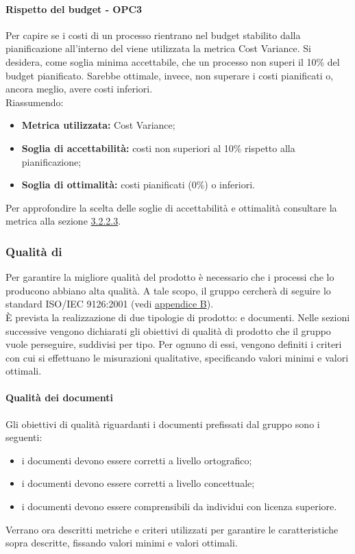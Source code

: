 \documentclass[PianoDiQualifica.tex]{subfiles}
\begin{document}
			\paragraph{Rispetto del budget - OPC3}
			Per capire se i costi di un processo rientrano nel budget stabilito dalla pianificazione all'interno del \PPdocRR{} viene utilizzata la metrica Cost Variance.
			Si desidera, come soglia minima accettabile, che un processo non superi il 10\% del budget pianificato. Sarebbe ottimale, invece, non superare i costi pianificati o, ancora meglio, avere costi inferiori.\\
			Riassumendo:
			\begin{itemize}
			\item \textbf{Metrica utilizzata:} Cost Variance;
			\item \textbf{Soglia di accettabilità:} costi non superiori al 10\% rispetto alla pianificazione;
			\item \textbf{Soglia di ottimalità:}  costi pianificati (0\%) o inferiori.
			\end{itemize}
			Per approfondire la scelta delle soglie di accettabilità e ottimalità consultare la metrica alla sezione \hyperlink{Cost_m}{3.2.2.3}.

		\subsubsection{Qualità di }
		Per garantire la migliore qualità del prodotto è necessario che i processi che lo producono abbiano alta qualità.
		A tale scopo, il gruppo \GRUPPO{} cercherà di seguire lo standard ISO/IEC 9126:2001 (vedi \hyperlink{ISOIEC}{appendice B}). \\
		È prevista la realizzazione di due tipologie di prodotto:  e documenti.
		Nelle sezioni successive vengono dichiarati gli obiettivi di qualità di prodotto che il gruppo vuole perseguire, suddivisi per tipo.
		Per ognuno di essi, vengono definiti i criteri con cui si effettuano le misurazioni qualitative, specificando valori minimi e valori ottimali.

			\paragraph{Qualità dei documenti}
			Gli obiettivi di qualità riguardanti i documenti prefissati dal gruppo \GRUPPO{} sono i seguenti:
			\begin{itemize}
				\item i documenti devono essere corretti a livello ortografico;
				\item i documenti devono essere corretti a livello concettuale;
				\item i documenti devono essere comprensibili da individui con licenza superiore.
			\end{itemize}
			Verrano ora descritti metriche e criteri utilizzati per garantire le caratteristiche sopra descritte, fissando valori minimi e valori ottimali.
\end{document}
